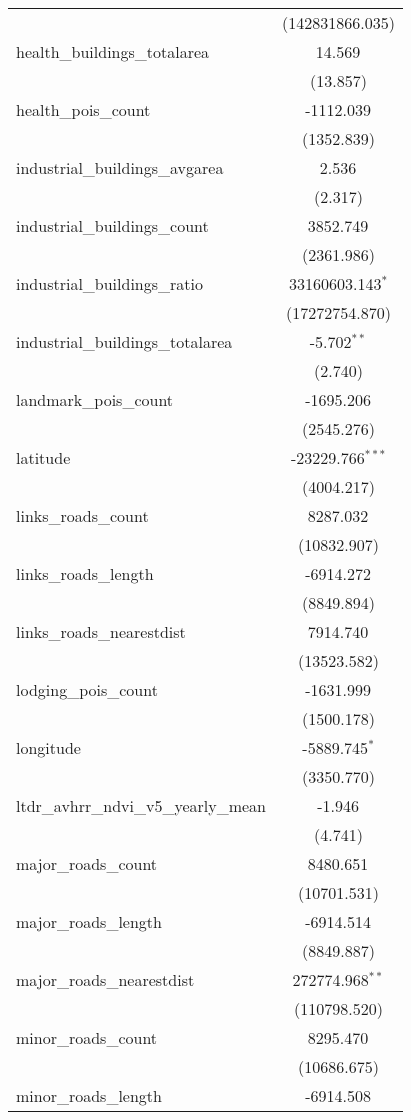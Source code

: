 \begin{table}[!htbp]
\begin{tabular}{@{\extracolsep{5pt}}lc}
  & (142831866.035) \\
 health_buildings_totalarea & 14.569$^{}$ \\
  & (13.857) \\
 health_pois_count & -1112.039$^{}$ \\
  & (1352.839) \\
 industrial_buildings_avgarea & 2.536$^{}$ \\
  & (2.317) \\
 industrial_buildings_count & 3852.749$^{}$ \\
  & (2361.986) \\
 industrial_buildings_ratio & 33160603.143$^{*}$ \\
  & (17272754.870) \\
 industrial_buildings_totalarea & -5.702$^{**}$ \\
  & (2.740) \\
 landmark_pois_count & -1695.206$^{}$ \\
  & (2545.276) \\
 latitude & -23229.766$^{***}$ \\
  & (4004.217) \\
 links_roads_count & 8287.032$^{}$ \\
  & (10832.907) \\
 links_roads_length & -6914.272$^{}$ \\
  & (8849.894) \\
 links_roads_nearestdist & 7914.740$^{}$ \\
  & (13523.582) \\
 lodging_pois_count & -1631.999$^{}$ \\
  & (1500.178) \\
 longitude & -5889.745$^{*}$ \\
  & (3350.770) \\
 ltdr_avhrr_ndvi_v5_yearly_mean & -1.946$^{}$ \\
  & (4.741) \\
 major_roads_count & 8480.651$^{}$ \\
  & (10701.531) \\
 major_roads_length & -6914.514$^{}$ \\
  & (8849.887) \\
 major_roads_nearestdist & 272774.968$^{**}$ \\
  & (110798.520) \\
 minor_roads_count & 8295.470$^{}$ \\
  & (10686.675) \\
 minor_roads_length & -6914.508$^{}$ \\

\end{tabular}
\end{table}

